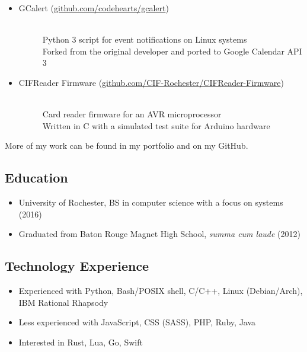 \documentclass[10pt]{article}
\begin{document}
\begin{itemize}
\begin{itemize}
\begin{description}
			\end{description}
			\item \begin{description}
				\item[GCalert (\href{https://github.com/codehearts/gcalert}{github.com/codehearts/gcalert})] \hfill \\
					Python 3 script for event notifications on Linux systems \\
					Forked from the original developer and ported to Google Calendar API 3
			\end{description}
			\item \begin{description}
				\item[CIFReader Firmware (\href{https://github.com/CIF-Rochester/CIFReader-Firmware}{github.com/CIF-Rochester/CIFReader-Firmware})] \hfill \\
					Card reader firmware for an AVR microprocessor \\
					Written in C with a simulated test suite for Arduino hardware
			\end{description}
		\end{itemize}
\end{itemize}
\vspace{-0.75em}
More of my work can be found in my portfolio and on my GitHub.



\subsection*{Education}

\begin{itemize}
	\item University of Rochester, BS in computer science with a focus on systems (2016)
	\item Graduated from Baton Rouge Magnet High School, \textit{summa cum laude} (2012)
\end{itemize}



\subsection*{Technology Experience}

\begin{itemize}
  \item Experienced with Python, Bash/POSIX shell, C/C++, Linux (Debian/Arch), IBM Rational Rhapsody
  \item Less experienced with JavaScript, CSS (SASS), PHP, Ruby, Java
  \item Interested in Rust, Lua, Go, Swift
\end{itemize}
\end{document}
